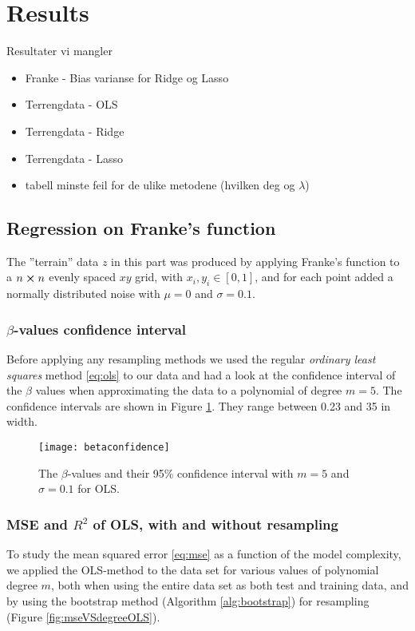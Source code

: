 \section{Results}
\label{sec:results}
Resultater vi mangler
\begin{itemize}
\item Franke - Bias varianse for Ridge og Lasso
\item Terrengdata - OLS
\item Terrengdata - Ridge
\item Terrengdata - Lasso
\item tabell minste feil for de ulike metodene (hvilken deg og $\lambda$)
\end{itemize}
\subsection{Regression on Franke's function}
The {''}terrain'' data $z$ in this part was produced by applying Franke's function to a $n\cross n$ evenly spaced $xy$ grid, with $x_i,y_i\in [0,1]$, and for each point added a normally distributed noise with $\mu = 0$ and $\sigma = 0.1$.
\subsubsection{$\beta$-values confidence interval}
Before applying any resampling methods we used the regular \emph{ordinary least squares} method \eqref{eq:ols} to our data and had a look at the confidence interval of the $\beta$ values when approximating the data to a polynomial of degree $m=5$. The confidence intervals are shown in Figure \ref{fig:betaconfidence}.
They range between 0.23 and 35 in width.  
\begin{figure}[htbp]
	\centering
	\texttt{[image: betaconfidence]}
	\caption{The $\beta$-values and their 95\% confidence interval with $m=5$ and $\sigma=0.1$ for OLS.}
	\label{fig:betaconfidence}
\end{figure}

\subsubsection{MSE and $R^2$ of OLS, with and without resampling}
To study the mean squared error \eqref{eq:mse} as a function of the model complexity, we applied the OLS-method to the data set for various values of polynomial degree $m$, both when using the entire data set as both test and training data, and by using the bootstrap method (Algorithm \ref{alg:bootstrap}) for resampling (Figure \ref{fig:mseVSdegreeOLS}).

